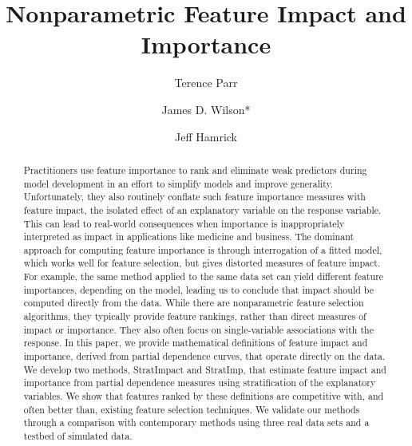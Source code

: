 \documentclass[smallextended]{svjour3}       %
\newcommand{\cut}[1]{}
\begin{document}
\title{\bf Nonparametric Feature Impact and Importance}

\cut{
\author{Terence Parr \email parrt@cs.usfca.edu
\addr University of San Francisco\\
\AND James D. Wilson \email jdwilson4@usfca.edu
\addr University of San Francisco\\
\AND Jeff Hamrick \email jhamrick@usfca.edu
      \addr University of San Francisco}
}

\author{Terence Parr \and James D. Wilson* \and Jeff Hamrick}


\maketitle

\begin{abstract}%
Practitioners use feature importance to rank and eliminate weak predictors during model development in an effort to simplify models and improve generality.  Unfortunately, they also routinely conflate such feature importance measures with feature impact, the isolated effect of an explanatory variable on the response variable. This can lead to real-world consequences when importance is inappropriately interpreted as impact in applications like medicine and business. The dominant approach for computing feature importance is through interrogation of a fitted model, which works well for feature selection, but gives distorted measures of feature impact. For example, the same method applied to the same data set can yield different feature importances, depending on the model, leading us to conclude that impact should be computed directly from the data.  While there are nonparametric feature selection algorithms, they typically provide feature rankings, rather than direct measures of impact or importance. They also often focus on single-variable associations with the response. In this paper, we provide mathematical definitions of feature impact and importance, derived from partial dependence curves, that operate directly on the data. We develop two methods, StratImpact and StratImp, that estimate feature impact and importance from partial dependence measures using stratification of the explanatory variables. We show that features ranked by these definitions are competitive with, and often better than, existing feature selection techniques. We validate our methods through a comparison with contemporary methods using three real data sets and a testbed of simulated data.
\end{abstract}
\end{document}
